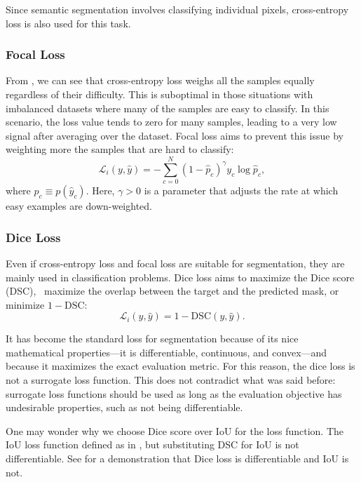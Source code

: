 Since semantic segmentation involves classifying individual pixels, cross-entropy loss is also used for this task.

\subsubsection{Focal Loss} From , we can see that cross-entropy loss weighs all the samples equally regardless of their difficulty. This is suboptimal in those situations with imbalanced datasets where many of the samples are easy to classify. In this scenario, the loss value tends to zero for many samples, leading to a very low signal after averaging over the dataset. Focal loss aims to prevent this issue by weighting more the samples that are hard to classify:
\begin{equation}
    \mathcal{L}_i(y,\hat{y})= -\sum_{c=0}^N (1-\hat{p}_c)^\gamma y_c\log \hat{p}_c,
    \label{eq:focalloss}
\end{equation}
where $\hat{p}_c \equiv p(\hat{y}_c)$. Here, $\gamma > 0$ is a parameter that adjusts the rate at which easy examples are down-weighted.

\subsubsection{Dice Loss} Even if cross-entropy loss and focal loss are suitable for segmentation, they are mainly used in classification problems. Dice loss aims to maximize the Dice score (DSC), \ie~maximize the overlap between the target and the predicted mask, or minimize $1 - \text{DSC}$:
\begin{equation}
    \mathcal{L}_i(y,\hat{y}) = 1 - \text{DSC}(y, \hat{y}).
    \label{eq:diceloss}
\end{equation}

It has become the standard loss for segmentation because of its nice mathematical properties---it is differentiable, continuous, and convex---and because it maximizes the exact evaluation metric. For this reason, the dice loss is not a surrogate loss function. This does not contradict what was said before: surrogate loss functions should be used as long as the evaluation objective has undesirable properties, such as not being differentiable. 

One may wonder why we choose Dice score over IoU for the loss function. The IoU loss function defined as in , but substituting DSC for IoU is not differentiable. See  for a demonstration that Dice loss is differentiable and IoU is not.

